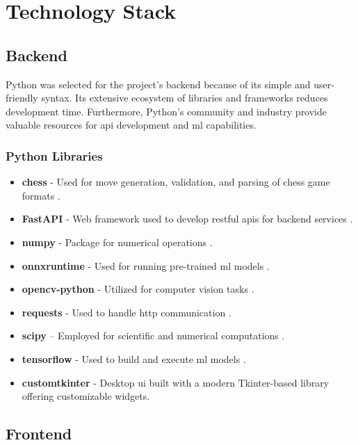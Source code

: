 \newpage

\section{Technology Stack}
\label{sec:technology-stack}

\subsection*{Backend}

Python was selected for the project’s backend because of its simple and user-friendly syntax. Its extensive ecosystem of libraries and frameworks reduces development time. Furthermore, Python’s community and industry provide valuable resources for \gls{api} development and \gls{ml} capabilities.

\subsubsection*{Python Libraries}

\begin{itemize}
    \item \textbf{chess} - Used for move generation, validation, and parsing of chess game formats \cite{python:chess}.
    \item \textbf{FastAPI} - Web framework used to develop \acrshort{rest}ful \glspl{api} for backend services \cite{python:fastapi}.
    \item \textbf{numpy} - Package for numerical operations \cite{python:numpy}.
    \item \textbf{onnxruntime} - Used for running pre-trained \gls{ml} models \cite{python:onnx}.
    \item \textbf{opencv-python} - Utilized for computer vision tasks \cite{python:opencv}.
    \item \textbf{requests} - Used to handle \gls{http} communication \cite{python:requests}.
    \item \textbf{scipy} – Employed for scientific and numerical computations \cite{python:scipy}.
    \item \textbf{tensorflow} - Used to build and execute \gls{ml} models \cite{python:tensorflow}.
    \item \textbf{customtkinter} - Desktop \gls{ui} built with a modern Tkinter-based library offering customizable widgets. \cite{python:ctk}
\end{itemize}


\subsection*{Frontend}


